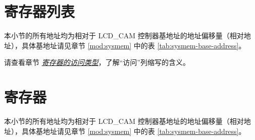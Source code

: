 \documentclass[main\_\_CN.tex]{subfiles}
\begin{document}

\clearpage
\hypertarget{camlcdctrl-reg-summ}{}
\section{寄存器列表}
\label{sec:camlcdctrl-reg-summ}

本小节的所有地址均为相对于 LCD\_CAM 控制器基地址的地址偏移量（相对地址），具体基地址请见章节 \ref{mod:sysmem} \textit{} 中的表 \ref{tab:sysmem-base-address}。

请查看章节 \hyperref[glossary-access-types]{\textit{寄存器的访问类型}}，了解“访问”列缩写的含义。







\section{寄存器}

本小节的所有地址均为相对于 LCD\_CAM 控制器基地址的地址偏移量（相对地址），具体基地址请见章节 \ref{mod:sysmem} \textit{} 中的表 \ref{tab:sysmem-base-address}。


\end{document}
